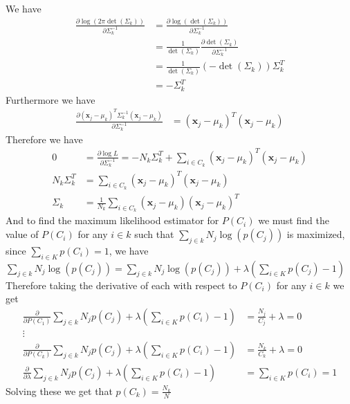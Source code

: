 \documentclass[12pt]{article}
\begin{document}
We have
\begin{align*}
    \frac{\partial\log(2\pi\det(\Sigma_k))}{\partial \Sigma_k^{-1}}&=\frac{\partial\log(\det(\Sigma_k))}{\partial \Sigma_k^{-1}}\\
    &=\frac{1}{\det(\Sigma_k)}\frac{\partial \det(\Sigma_k)}{\partial \Sigma_k^{-1}}\\
    &=\frac{1}{\det(\Sigma_k)}(-\det(\Sigma_k))\Sigma_k^T\\
    &=-\Sigma_k^T
\end{align*}
Furthermore we have
\begin{align*}
    \frac{\partial(\textbf{x}_j-\mu_k)^T\Sigma_k^{-1}(\textbf{x}_j-\mu_k)}{\partial \Sigma_k^{-1}}&=(\textbf{x}_j-\mu_k)^T(\textbf{x}_j-\mu_k)
\end{align*}
Therefore we have
\begin{align*}
    0&=\frac{\partial \log{L}}{\partial \Sigma_k^{-1}}=-N_k\Sigma_k^T+\sum_{i\in C_k}(\textbf{x}_j-\mu_k)^T(\textbf{x}_j-\mu_k)\\
    N_k\Sigma_k^T&=\sum_{i\in C_k}(\textbf{x}_j-\mu_k)^T(\textbf{x}_j-\mu_k)\\
    \Sigma_k&=\boxed{\frac{1}{N_k}\sum_{i\in C_k}(\textbf{x}_j-\mu_k)(\textbf{x}_j-\mu_k)^T}
\end{align*}
And to find the maximum likelihood estimator for $P(C_i)$ we must find the value of $P(C_i)$ for any $i\in k$ such that 
$\sum_{j \in k} N_j\log(p(C_j))$ is maximized, since $\sum_{i\in K}p(C_i)=1$, we have $\sum_{j \in k} N_j\log(p(C_j))=\sum_{j \in k} N_j\log(p(C_j))+\lambda(\sum_{i\in K}p(C_j)-1)$
Therefore taking the derivative of each with respect to $P(C_i)$ for any $i\in k$ we get
\begin{align*}
    \frac{\partial }{\partial P(C_1)}\sum_{j \in k} N_jp(C_j)+\lambda(\sum_{i\in K}p(C_i)-1)&=\frac{N_j}{C_j}+\lambda=0\\
    \vdots \\
    \frac{\partial }{\partial P(C_k)}\sum_{j \in k} N_jp(C_j)+\lambda(\sum_{i\in K}p(C_i)-1)&=\frac{N_k}{C_k}+\lambda=0\\
    \frac{\partial }{\partial \lambda}\sum_{j \in k} N_jp(C_j)+\lambda(\sum_{i\in K}p(C_i)-1)&=\sum_{i\in K}p(C_i)=1
\end{align*}
Solving these we get that $p(C_k)=\boxed{\frac{N_k}{N}}$
\end{document}
